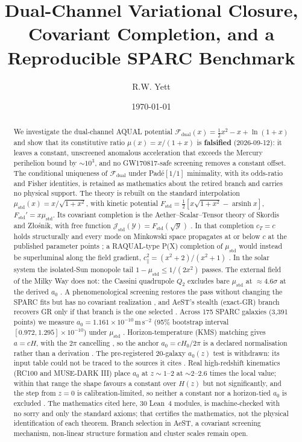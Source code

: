 \documentclass[aps,prd,preprint,superscriptaddress,nofootinbib,amsmath,amssymb,floatfix]{revtex4-2}
\makeatletter
\DeclareRobustCommand{\rntexttt}[1]{%
  \ifmmode
    \nfss@text{\ttfamily\hyphenchar\font=-1 #1}%
  \else
    \hmode@bgroup\ttfamily\hyphenchar\font=-1 #1\egroup
  \fi}
\DeclareRobustCommand{\_}{%
    \ifmmode\nfss@text{\textunderscore}\else\textunderscore\penalty\z@\fi}%
\let\texttt\rntexttt
\makeatother
\begin{document}


\title{Dual-Channel Variational Closure, Covariant Completion, and a Reproducible SPARC Benchmark}

\author{R.W. Yett}

\date{\today}

\begin{abstract}
We investigate the dual-channel AQUAL potential $\mathcal{F}_{\text{dual}}(x) = \tfrac{1}{2}x^2 - x + \ln(1+x)$ and show that its constitutive ratio $\mu(x) = x/(1+x)$ is \textbf{falsified} (2026-09-12): it leaves a constant, unscreened anomalous acceleration that exceeds the Mercury perihelion bound by $\sim10^3$, and no GW170817-safe screening removes a constant offset. The conditional uniqueness of $\mathcal{F}_{\text{dual}}$ under Pad\'e$[1/1]$ minimality, with its odds-ratio and Fisher identities, is retained as mathematics about the retired branch  and carries no physical support. The theory is rebuilt on the standard interpolation $\mu_{\text{std}}(x) = x/\sqrt{1+x^2}$, with kinetic potential $F_{\text{std}} = \tfrac12[x\sqrt{1+x^2} - \operatorname{arsinh} x]$, $F_{\text{std}}' = x\mu_{\text{std}}$. Its covariant completion is the Aether--Scalar--Tensor theory of Skordis and Z\l{}o\'snik, with free function $\mathcal{J}_{\text{std}}(\mathcal{Y}) = F_{\text{std}}(\sqrt{\mathcal{Y}})$ . In that completion $c_T = c$ holds structurally and every mode on Minkowski space propagates at or below $c$ at the published parameter points ; a RAQUAL-type P(X) completion of $\mu_{\text{std}}$ would instead be superluminal along the field gradient, $c_\parallel^2 = (x^2+2)/(x^2+1)$ . In the solar system the isolated-Sun monopole tail $1-\mu_{\text{std}} \le 1/(2x^2)$ passes. The external field of the Milky Way does not: the Cassini quadrupole $Q_2$ excludes bare $\mu_{\text{std}}$ at $\approx 4.6\sigma$ at the derived $a_0$ . A phenomenological screening restores the pass without changing the SPARC fits but has no covariant realization , and AeST's stealth (exact-GR) branch recovers GR only if that branch is the one selected . Across 175 SPARC galaxies (3,391 points) we measure $a_0 = 1.161\times10^{-10}\,\mathrm{m\,s^{-2}}$ (95\% bootstrap interval $[0.972, 1.295]\times10^{-10}$) under $\mu_{\text{std}}$ . Horizon-temperature (KMS) matching gives $a = cH$, with the $2\pi$ cancelling , so the anchor $a_0 = cH_0/2\pi$ is a declared normalisation rather than a derivation . The pre-registered 20-galaxy $a_0(z)$ test is withdrawn: its input table could not be traced to the sources it cites . Real high-redshift kinematics (RC100 and MUSE-DARK III) place $a_0$ at $z\sim1$--$2$ at $\sim2$--$2.6$ times the local value; within that range the shape favours a constant over $H(z)$ but not significantly, and the step from $z=0$ is calibration-limited, so neither a constant nor a horizon-tied $a_0$ is excluded . The mathematics cited here, 30 Lean~4 modules, is machine-checked with no \texttt{sorry} and only the standard axioms; that certifies the mathematics, not the physical identification of each theorem. Branch selection in AeST, a covariant screening mechanism, non-linear structure formation and cluster scales remain open.

\end{abstract}
\end{document}
